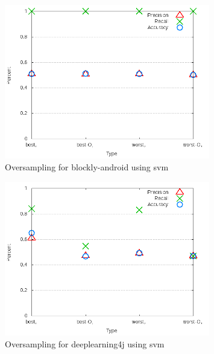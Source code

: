 \begin{figure}[!ht]
    \centering
        \includegraphics[width=0.8\textwidth]{images/svm/test_4/blockly-android_sample_range}
        \caption{Oversampling for blockly-android using \gls{svm}}
        \label{fig:test_4_blockly-android_svm}
\end{figure}

\begin{figure}[!ht]
    \centering
        \includegraphics[width=0.8\textwidth]{images/svm/test_4/deeplearning4j_sample_range}
    \caption{Oversampling for deeplearning4j using \gls{svm}}
    \label{fig:test_4_deeplearning4j_svm}
\end{figure}

